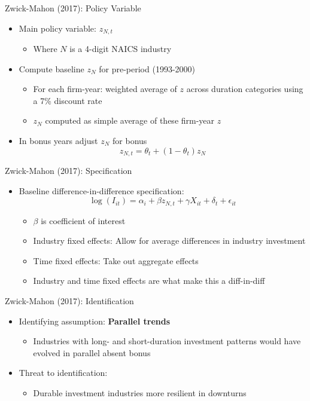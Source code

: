 \documentclass[11pt,aspectratio=169,xcolor={dvipsnames},hyperref={pdftex,pdfpagemode=UseNone,hidelinks,pdfdisplaydoctitle=true},usepdftitle=false]{beamer}
\begin{document}
\begin{frame}{Zwick-Mahon (2017): Policy Variable}
\begin{itemize}
	\itemsep1em 
	\item Main policy variable: $z_{N,t}$
	\begin{itemize}
		\item Where $N$ is a 4-digit NAICS industry
	\end{itemize}
	\item Compute baseline $z_N$ for pre-period (1993-2000)
	\begin{itemize}
		\item For each firm-year: weighted average of $z$ across duration categories using a 7\% discount rate
		\item $z_N$ computed as simple average of these firm-year $z$
	\end{itemize}
	\item In bonus years adjust $z_N$ for bonus
	\[z_{N,t} = \theta_t + (1-\theta_t)z_N \]  
\end{itemize}
\end{frame}


\begin{frame}{Zwick-Mahon (2017): Specification}
\begin{itemize}
	\item Baseline difference-in-difference specification:
	\[\log(I_{it}) = \alpha_i + \beta z_{N,t} + \gamma X_{it} + \delta_t + \epsilon_{it} \] \vspace{-15pt} 
	\begin{itemize}
		\item $\beta$ is coefficient of interest
		\item Industry fixed effects: Allow for average differences in industry investment
		\item Time fixed effects: Take out aggregate effects
		\item Industry and time fixed effects are what make this a diff-in-diff 
	\end{itemize}
\end{itemize}
\end{frame}


\begin{frame}{Zwick-Mahon (2017): Identification}
\begin{itemize}
	\itemsep1em 
	\item Identifying assumption: \textbf{Parallel trends}
	\begin{itemize}
		\item Industries with long- and short-duration investment patterns would have evolved in parallel absent bonus
	\end{itemize}
	\item Threat to identification:
	\begin{itemize}
		\item Durable investment industries more resilient in downturns
	\end{itemize}
\end{itemize}
\end{frame}
\end{document}
